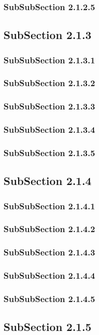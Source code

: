 \subsubsection{SubSubSection 2.1.2.5}
\subsection{SubSection 2.1.3}
\subsubsection{SubSubSection 2.1.3.1}
\subsubsection{SubSubSection 2.1.3.2}
\subsubsection{SubSubSection 2.1.3.3}
\subsubsection{SubSubSection 2.1.3.4}
\subsubsection{SubSubSection 2.1.3.5}
\subsection{SubSection 2.1.4}
\subsubsection{SubSubSection 2.1.4.1}
\subsubsection{SubSubSection 2.1.4.2}
\subsubsection{SubSubSection 2.1.4.3}
\subsubsection{SubSubSection 2.1.4.4}
\subsubsection{SubSubSection 2.1.4.5}
\subsection{SubSection 2.1.5}
